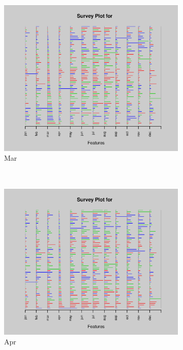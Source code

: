 \documentclass{article}
\begin{document}
\begin{enumerate}[leftmargin = 0 em, label = \arabic*., font = \bfseries]
\begin{enumerate}
\begin{enumerate}
\begin{figure}[!htb]
            \centering
        	\begin{subfigure}[b]{0.3\textwidth}
        	\includegraphics[width = \textwidth]{3cii3.eps}
        	\caption{Mar}
        	\end{subfigure}\\
        	\begin{subfigure}[b]{0.3\textwidth}
        	\includegraphics[width = \textwidth]{3cii4.eps}
        	\caption{Apr}
        	\end{subfigure}%
        	\begin{subfigure}[b]{0.3\textwidth}

\end{subfigure}
\end{figure}
\end{enumerate}
\end{enumerate}
\end{enumerate}
\end{document}

